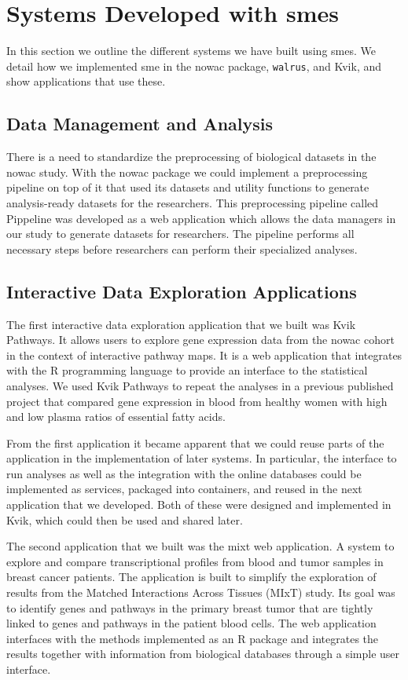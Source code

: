 \section{Systems Developed with \glspl{sme}}
In this section we outline the different systems we have built using
\glspl{sme}. We detail how we implemented \gls{sme} in the \gls{nowac} package,
\texttt{walrus}, and Kvik, and show applications that use these. 

\subsection{Data Management and Analysis} 
There is a need to standardize the preprocessing of biological datasets in the
\gls{nowac} study. With the \gls{nowac} package we could implement a
preprocessing pipeline on top of it that used its datasets and utility functions
to generate analysis-ready datasets for the researchers.  This preprocessing
pipeline called Pippeline was developed as a web application which allows the
data managers in our study to generate datasets for researchers.
The pipeline performs all necessary steps before researchers can perform their
specialized analyses. 

\subsection{Interactive Data Exploration Applications}
The first interactive data exploration application that we built was Kvik
Pathways.  It allows users to explore gene expression data from the \gls{nowac}
cohort in the context of interactive pathway maps.\cite{fjukstad2015kvik} It is
a web application that integrates with the R programming language to provide an
interface to the statistical analyses. We used Kvik Pathways to repeat the
analyses in a previous published project that compared gene expression in blood
from healthy women with high and low plasma ratios of essential fatty
acids.\cite{olsen2013plasma}

From the first application it became apparent that we could reuse parts of the
application in the implementation of later systems. In particular, the interface
to run analyses as well as the integration with the online databases could be
implemented as services, packaged into containers, and reused in the next
application that we developed. Both of these were designed and implemented in
Kvik, which could then be used and shared later. 

The second application that we built was the \gls{mixt} web application. A
system to explore and compare transcriptional profiles from blood and tumor
samples in breast cancer patients. The application is built to simplify the
exploration of results from the Matched Interactions Across Tissues (MIxT)
study. Its goal was to identify genes and pathways in the primary breast tumor
that are tightly linked to genes and pathways in the patient blood
cells.\cite{dumeaux2017interactions} The web application interfaces with the
methods implemented as an R package and integrates the results together with
information from biological databases through a simple user interface. 

